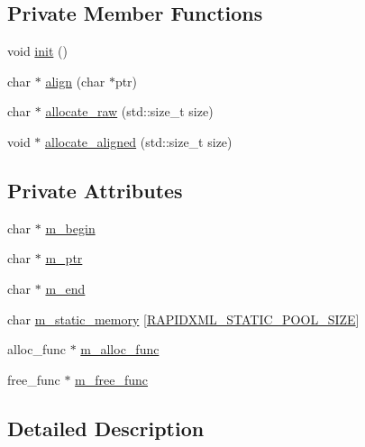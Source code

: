 \subsection*{Private Member Functions}
\begin{DoxyCompactItemize}
\item 
void \mbox{\hyperlink{classrapidxml_1_1memory__pool_a1076043ef092e327e59dd988c1ba82fb}{init}} ()
\item 
char $\ast$ \mbox{\hyperlink{classrapidxml_1_1memory__pool_a317396afc1812f08b64a1dd9cde4039b}{align}} (char $\ast$ptr)
\item 
char $\ast$ \mbox{\hyperlink{classrapidxml_1_1memory__pool_a1aed504a747303352e05f61c6ccbbebb}{allocate\+\_\+raw}} (std\+::size\+\_\+t size)
\item 
void $\ast$ \mbox{\hyperlink{classrapidxml_1_1memory__pool_a4e9cf53fa5f9da3a8f31b754bd94b4ec}{allocate\+\_\+aligned}} (std\+::size\+\_\+t size)
\end{DoxyCompactItemize}
\subsection*{Private Attributes}
\begin{DoxyCompactItemize}
\item 
char $\ast$ \mbox{\hyperlink{classrapidxml_1_1memory__pool_a775205c5faa60b63385c24368d26d4e1}{m\+\_\+begin}}
\item 
char $\ast$ \mbox{\hyperlink{classrapidxml_1_1memory__pool_a4a89ff677c72afc163d1855cefc28013}{m\+\_\+ptr}}
\item 
char $\ast$ \mbox{\hyperlink{classrapidxml_1_1memory__pool_a6c9a83514446842518c9ffb7a38b76eb}{m\+\_\+end}}
\item 
char \mbox{\hyperlink{classrapidxml_1_1memory__pool_aacc5ca734ebfbef7f42251764eb396f4}{m\+\_\+static\+\_\+memory}} \mbox{[}\mbox{\hyperlink{rapidxml_8hpp_a001304844ab478e3b213749fc8d72ca2}{R\+A\+P\+I\+D\+X\+M\+L\+\_\+\+S\+T\+A\+T\+I\+C\+\_\+\+P\+O\+O\+L\+\_\+\+S\+I\+ZE}}\mbox{]}
\item 
alloc\+\_\+func $\ast$ \mbox{\hyperlink{classrapidxml_1_1memory__pool_ae8964773675d24f77a808356be773c1d}{m\+\_\+alloc\+\_\+func}}
\item 
free\+\_\+func $\ast$ \mbox{\hyperlink{classrapidxml_1_1memory__pool_af8f41565f4de167eb2f40ca20695f24d}{m\+\_\+free\+\_\+func}}
\end{DoxyCompactItemize}


\subsection{Detailed Description}
